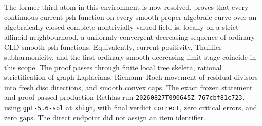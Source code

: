 The former third atom in this environment is now resolved.
 proves that every
continuous current-psh function on every smooth proper algebraic curve over
an algebraically closed complete nontrivially valued field is, locally on a
strict affinoid neighbourhood, a uniformly convergent decreasing sequence of
ordinary CLD-smooth psh functions.  Equivalently, current positivity,
Thuillier subharmonicity, and the first ordinary-smooth decreasing-limit
stage coincide in this scope.  The proof passes through finite local tree
skeleta, rational strictification of graph Laplacians, Riemann--Roch movement
of residual divisors into fresh disc directions, and smooth convex caps.
The exact frozen statement and proof passed production Rethlas run
\nolinkurl{20260827T090645Z_767cbf81c723}, using
\texttt{gpt-5.6-sol} at \texttt{xhigh}, with final verdict
\texttt{correct}, zero critical errors, and zero gaps.  The direct endpoint
did not assign an item identifier.

